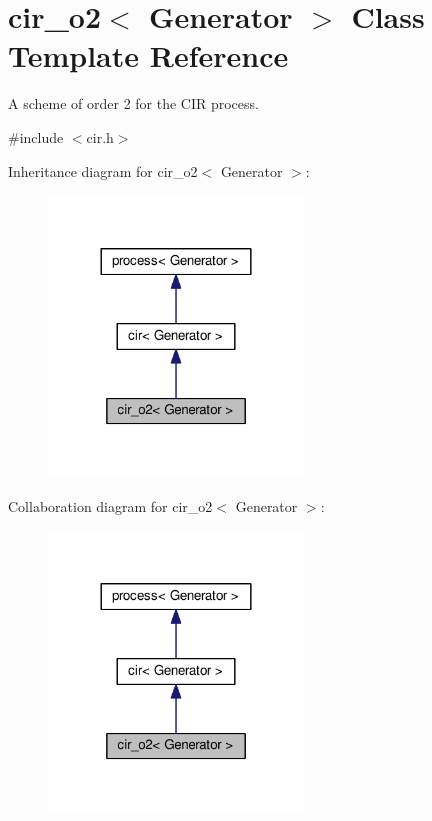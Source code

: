 \hypertarget{classcir__o2}{}\section{cir\+\_\+o2$<$ Generator $>$ Class Template Reference}
\label{classcir__o2}


A scheme of order 2 for the C\+IR process.  




{\ttfamily \#include $<$cir.\+h$>$}



Inheritance diagram for cir\+\_\+o2$<$ Generator $>$\+:\nopagebreak
\begin{figure}[H]
\begin{center}
\leavevmode
\includegraphics[width=192pt]{classcir__o2__inherit__graph}
\end{center}
\end{figure}


Collaboration diagram for cir\+\_\+o2$<$ Generator $>$\+:\nopagebreak
\begin{figure}[H]
\begin{center}
\leavevmode
\includegraphics[width=192pt]{classcir__o2__coll__graph}
\end{center}
\end{figure}

